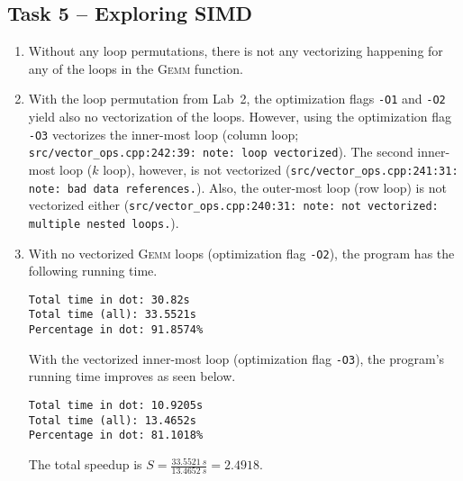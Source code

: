 \documentclass[a4paper, DIV12, headsepline]{scrartcl}
\begin{document}
% 
% 
% 
% 
% 


\subsection*{Task 5 -- Exploring SIMD}
\begin{enumerate}
\item Without any loop permutations, there is not any vectorizing happening for any of the loops in the \textsc{Gemm} function.

\item With the loop permutation from Lab~2, the optimization flags \verb|-O1| and \verb|-O2| yield also no vectorization of the loops. However, using the optimization flag \verb|-O3| vectorizes the inner-most loop (column loop; \texttt{src/vector\_ops.cpp:242:39: note: loop vectorized}). The second inner-most loop ($k$ loop), however, is not vectorized (\texttt{src/vector\_ops.cpp:241:31: note: bad data references.}). Also, the outer-most loop (row loop) is not vectorized either (\texttt{src/vector\_ops.cpp:240:31: note: not vectorized: multiple nested loops.}).

\item With no vectorized \textsc{Gemm} loops (optimization flag \verb|-O2|), the program has the following running time.
\begin{verbatim}
Total time in dot: 30.82s
Total time (all): 33.5521s
Percentage in dot: 91.8574%
\end{verbatim}
With the vectorized inner-most loop (optimization flag \verb|-O3|), the program's running time improves as seen below.
\begin{verbatim}
Total time in dot: 10.9205s
Total time (all): 13.4652s
Percentage in dot: 81.1018%
\end{verbatim}
The total speedup is $S = \frac{\SI{33.5521}{s}}{\SI{13.4652}{s}} = 2.4918$.
\end{enumerate}
\end{document}
